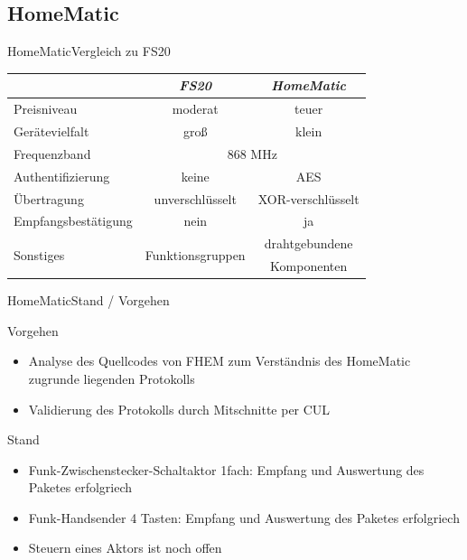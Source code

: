 \subsection{HomeMatic}

\begin{frame}{HomeMatic}{Vergleich zu FS20}
		\centering
	\begin{tabular}{lcc}
	\toprule
	           & \textit{FS20} & \textit{HomeMatic} \tabularnewline
	\midrule
	Preisniveau & moderat & teuer \tabularnewline
	Gerätevielfalt & groß & klein \tabularnewline
	Frequenzband & \multicolumn{2}{c}{868 MHz} \tabularnewline
	Authentifizierung & keine & AES \tabularnewline
	Übertragung & unverschlüsselt & XOR-verschlüsselt  \tabularnewline
	Empfangsbestätigung & nein & ja  \tabularnewline
	\multirow{2}{*}{Sonstiges} & \multirow{2}{*}{Funktionsgruppen} & drahtgebundene \tabularnewline
	                           &                                   & Komponenten\tabularnewline
	\bottomrule
	\end{tabular}
\end{frame}

\begin{frame}{HomeMatic}{Stand / Vorgehen}
\begin{block}{Vorgehen}
\begin{itemize}
\item 	Analyse des Quellcodes von FHEM zum Verständnis des HomeMatic
		zugrunde liegenden Protokolls
\item 	Validierung des Protokolls durch Mitschnitte per CUL
\end{itemize}
\end{block}

\begin{block}{Stand}
\begin{itemize}
\item 	Funk-Zwischenstecker-Schaltaktor 1fach: Empfang und Auswertung des Paketes erfolgriech
\item 	Funk-Handsender 4 Tasten: Empfang und Auswertung des Paketes erfolgriech
\item 	Steuern eines Aktors ist noch offen
\end{itemize}
\end{block}
\end{frame}

